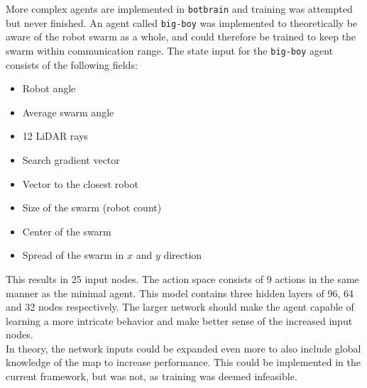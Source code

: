 More complex agents are implemented in \texttt{botbrain} and training was attempted but never finished. An agent called \texttt{big-boy} was implemented to theoretically be aware of the robot swarm as a whole, and could therefore be trained to keep the swarm within communication range. The state input for the \texttt{big-boy} agent consists of the following fields:

\begin{itemize}
    \item Robot angle
    \item Average swarm angle
    \item 12 LiDAR rays
    \item Search gradient vector
    \item Vector to the closest robot
    \item Size of the swarm (robot count)
    \item Center of the swarm
    \item Spread of the swarm in $x$ and $y$ direction
\end{itemize}

This results in 25 input nodes. The action space consists of 9 actions in the same manner as the minimal agent. This model contains three hidden layers of 96, 64 and 32 nodes respectively. The larger network should make the agent capable of learning a more intricate behavior and make better sense of the increased input nodes. \\

In theory, the network inputs could be expanded even more to also include global knowledge of the map to increase performance. This could be implemented in the current framework, but was not, as training was deemed infeasible.
